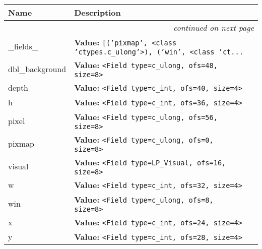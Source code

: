     \vspace{-1cm}
\hspace{\varindent}\begin{longtable}{|p{\varnamewidth}|p{\vardescrwidth}|l}
\cline{1-2}
\cline{1-2} \centering \textbf{Name} & \centering \textbf{Description}& \\
\cline{1-2}
\endhead\cline{1-2}\multicolumn{3}{r}{\small\textit{continued on next page}}\\\endfoot\cline{1-2}
\endlastfoot\raggedright \_\-f\-i\-e\-l\-d\-s\-\_\- & \raggedright \textbf{Value:} 
{\tt \texttt{[}\texttt{(}\texttt{'}\texttt{pixmap}\texttt{'}\texttt{, }{\textless}class 'ctypes.c\_ulong'{\textgreater}\texttt{)}\texttt{, }\texttt{(}\texttt{'}\texttt{win}\texttt{'}\texttt{, }{\textless}class 'ct\texttt{...}}&\\
\cline{1-2}
\raggedright d\-b\-l\-\_\-b\-a\-c\-k\-g\-r\-o\-u\-n\-d\- & \raggedright \textbf{Value:} 
{\tt {\textless}Field type=c\_ulong, ofs=48, size=8{\textgreater}}&\\
\cline{1-2}
\raggedright d\-e\-p\-t\-h\- & \raggedright \textbf{Value:} 
{\tt {\textless}Field type=c\_int, ofs=40, size=4{\textgreater}}&\\
\cline{1-2}
\raggedright h\- & \raggedright \textbf{Value:} 
{\tt {\textless}Field type=c\_int, ofs=36, size=4{\textgreater}}&\\
\cline{1-2}
\raggedright p\-i\-x\-e\-l\- & \raggedright \textbf{Value:} 
{\tt {\textless}Field type=c\_ulong, ofs=56, size=8{\textgreater}}&\\
\cline{1-2}
\raggedright p\-i\-x\-m\-a\-p\- & \raggedright \textbf{Value:} 
{\tt {\textless}Field type=c\_ulong, ofs=0, size=8{\textgreater}}&\\
\cline{1-2}
\raggedright v\-i\-s\-u\-a\-l\- & \raggedright \textbf{Value:} 
{\tt {\textless}Field type=LP\_Visual, ofs=16, size=8{\textgreater}}&\\
\cline{1-2}
\raggedright w\- & \raggedright \textbf{Value:} 
{\tt {\textless}Field type=c\_int, ofs=32, size=4{\textgreater}}&\\
\cline{1-2}
\raggedright w\-i\-n\- & \raggedright \textbf{Value:} 
{\tt {\textless}Field type=c\_ulong, ofs=8, size=8{\textgreater}}&\\
\cline{1-2}
\raggedright x\- & \raggedright \textbf{Value:} 
{\tt {\textless}Field type=c\_int, ofs=24, size=4{\textgreater}}&\\
\cline{1-2}
\raggedright y\- & \raggedright \textbf{Value:} 
{\tt {\textless}Field type=c\_int, ofs=28, size=4{\textgreater}}&\\
\cline{1-2}
\end{longtable}

